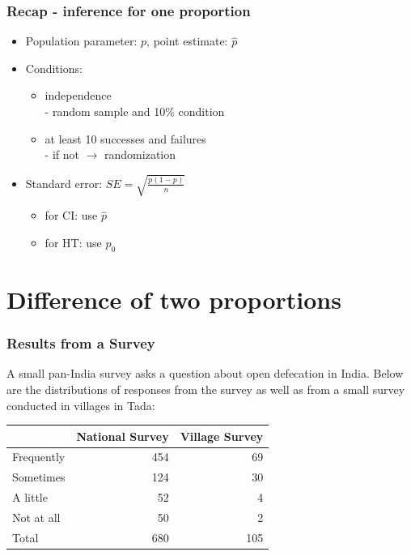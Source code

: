 \documentclass[notes,11pt, aspectratio=169]{beamer}
\begin{document}
\begin{frame}
\frametitle{Recap - inference for one proportion}

\begin{itemize}

\item Population parameter: $p$, point estimate: $\hat{p}$

\pause

\item Conditions:
\begin{itemize}
\item independence \\
- random sample and 10\% condition
\item at least 10 successes and failures\\ - if not $\rightarrow$ randomization
\end{itemize}

\pause

\item Standard error: $SE = \sqrt{ \frac{p(1-p)}{n} }$
\begin{itemize}
\item for CI: use $\hat{p}$
\item for HT: use $p_0$
\end{itemize}

\end{itemize}

\end{frame}



\section{Difference of two proportions}



\begin{frame}
\frametitle{Results from a Survey}

A small pan-India survey asks a question about open defecation in India. Below are the distributions of responses from the survey as well as from a small survey conducted in villages in Tada: \\

\begin{center}
\begin{tabular}{l r r}
\hline
				& National Survey	& Village Survey \\
\hline
Frequently		& 454	& 69 \\
Sometimes			& 124 	& 30\\
A little			& 52 		& 4\\
Not at all			& 50 		& 2 \\
\hline
Total				& 680 	& 105\\
\hline
\end{tabular}
\end{center}

\end{frame}
\end{document}
